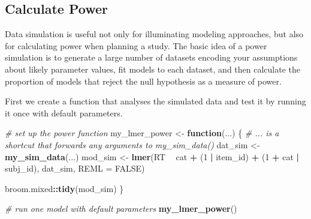 \documentclass[man,floatsintext]{apa6}
\newenvironment{Shaded}{\begin{snugshade}}{\end{snugshade}}
\newcommand{\CommentTok}[1]{\textcolor[rgb]{0.56,0.35,0.01}{\textit{#1}}}
\newcommand{\ControlFlowTok}[1]{\textcolor[rgb]{0.13,0.29,0.53}{\textbf{#1}}}
\newcommand{\DataTypeTok}[1]{\textcolor[rgb]{0.13,0.29,0.53}{#1}}
\newcommand{\DecValTok}[1]{\textcolor[rgb]{0.00,0.00,0.81}{#1}}
\newcommand{\KeywordTok}[1]{\textcolor[rgb]{0.13,0.29,0.53}{\textbf{#1}}}
\newcommand{\NormalTok}[1]{#1}
\newcommand{\OperatorTok}[1]{\textcolor[rgb]{0.81,0.36,0.00}{\textbf{#1}}}
\newcommand{\OtherTok}[1]{\textcolor[rgb]{0.56,0.35,0.01}{#1}}
\newcommand{\StringTok}[1]{\textcolor[rgb]{0.31,0.60,0.02}{#1}}
\begin{document}
\hypertarget{calculate-power}{%
\subsection{Calculate Power}\label{calculate-power}}

Data simulation is useful not only for illuminating modeling approaches, but also for calculating power when planning a study. The basic idea of a power simulation is to generate a large number of datasets encoding your assumptions about likely parameter values, fit models to each dataset, and then calculate the proportion of models that reject the null hypothesis as a measure of power.

First we create a function that analyses the simulated data and test it by running it once with default parameters.

\begin{Shaded}
\begin{Highlighting}[]
\CommentTok{# set up the power function}
\NormalTok{my_lmer_power <-}\StringTok{ }\ControlFlowTok{function}\NormalTok{(...) \{}
  \CommentTok{# ... is a shortcut that forwards any arguments to my_sim_data()}
\NormalTok{  dat_sim <-}\StringTok{ }\KeywordTok{my_sim_data}\NormalTok{(...)}
\NormalTok{  mod_sim <-}\StringTok{ }\KeywordTok{lmer}\NormalTok{(RT }\OperatorTok{~}\StringTok{ }\NormalTok{cat }\OperatorTok{+}\StringTok{ }\NormalTok{(}\DecValTok{1} \OperatorTok{|}\StringTok{ }\NormalTok{item_id) }\OperatorTok{+}\StringTok{ }\NormalTok{(}\DecValTok{1} \OperatorTok{+}\StringTok{ }\NormalTok{cat }\OperatorTok{|}\StringTok{ }\NormalTok{subj_id),}
\NormalTok{                dat_sim, }\DataTypeTok{REML =} \OtherTok{FALSE}\NormalTok{)}
  
\NormalTok{  broom.mixed}\OperatorTok{::}\KeywordTok{tidy}\NormalTok{(mod_sim)}
\NormalTok{\}}
\end{Highlighting}
\end{Shaded}

\begin{Shaded}
\begin{Highlighting}[]
\CommentTok{# run one model with default parameters}
\KeywordTok{my_lmer_power}\NormalTok{()}
\end{Highlighting}
\end{Shaded}
\end{document}
